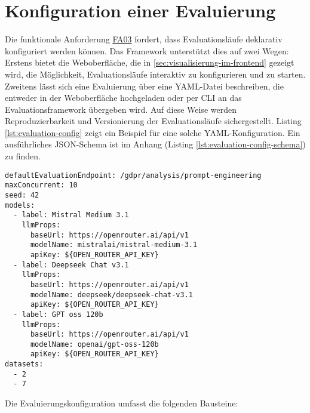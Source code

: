 \section{Konfiguration einer Evaluierung}\label{sec:konfiguration-einer-evaluierung}

Die funktionale Anforderung \hyperlink{FA03}{FA03} fordert, dass Evaluationsläufe deklarativ konfiguriert werden können. Das Framework unterstützt dies auf zwei Wegen:
Erstens bietet die Weboberfläche, die in \ref{sec:visualisierung-im-frontend} gezeigt wird, die Möglichkeit, Evaluationsläufe interaktiv zu konfigurieren und zu starten.
Zweitens lässt sich eine Evaluierung über eine YAML-Datei beschreiben, die entweder in der Weboberfläche hochgeladen oder per CLI an das Evaluationsframework übergeben wird. Auf diese Weise werden Reproduzierbarkeit und Versionierung der Evaluationsläufe sichergestellt. Listing \ref{lst:evaluation-config} zeigt ein Beispiel für eine solche YAML-Konfiguration. Ein ausführliches JSON-Schema ist im Anhang (Listing \ref{lst:evaluation-config-schema}) zu finden.

\begin{lstlisting}[caption={Beispiel einer Evaluierungskonfiguration in YAML.},label={lst:evaluation-config}]
defaultEvaluationEndpoint: /gdpr/analysis/prompt-engineering
maxConcurrent: 10
seed: 42
models:
  - label: Mistral Medium 3.1
    llmProps:
      baseUrl: https://openrouter.ai/api/v1
      modelName: mistralai/mistral-medium-3.1
      apiKey: ${OPEN_ROUTER_API_KEY}
  - label: Deepseek Chat v3.1
    llmProps:
      baseUrl: https://openrouter.ai/api/v1
      modelName: deepseek/deepseek-chat-v3.1
      apiKey: ${OPEN_ROUTER_API_KEY}
  - label: GPT oss 120b
    llmProps:
      baseUrl: https://openrouter.ai/api/v1
      modelName: openai/gpt-oss-120b
      apiKey: ${OPEN_ROUTER_API_KEY}
datasets:
  - 2
  - 7
\end{lstlisting}

Die Evaluierungskonfiguration umfasst die folgenden Bausteine:

